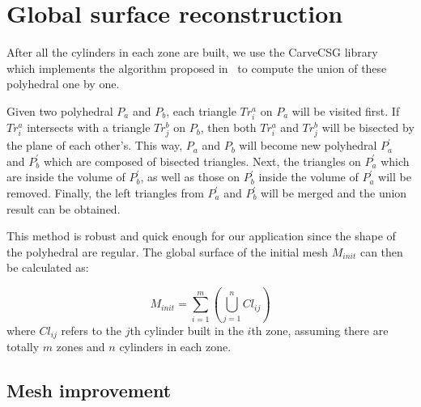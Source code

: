 \section{Global surface reconstruction} \label{ch4:sec:algo:global}


After all the cylinders in each zone are built, we use the
CarveCSG library~\cite{CarveCSG} which implements the algorithm proposed
in~\cite{LTH86} to compute the union of these polyhedral one by one.

Given two polyhedral $P_a$ and $P_b$, each triangle $Tr^a_i$ on $P_a$ will be
visited first. If $Tr^a_i$ intersects with a triangle $Tr^b_j$ on $P_b$, then
both $Tr^a_i$ and $Tr^b_j$ will be bisected by the plane of each other's.
This way, $P_a$ and $P_b$ will become new polyhedral $P^\prime_a$ and
$P^\prime_b$ which are composed of bisected triangles. Next, the triangles on
$P^\prime_a$ which are inside the volume of $P^\prime_b$, as well as
those on $P^\prime_b$ inside the volume of $P^\prime_a$ will be removed.
Finally, the left triangles from $P^\prime_a$ and $P^\prime_b$ will
be merged and the union result can be obtained.

This method is robust and quick enough for our application since the shape
of the polyhedral are regular. The global surface of the initial mesh
$M_{init}$ can then be calculated as:

\begin{equation}
\label{eq:surfreconstortho}
    M_{init}=\sum\limits_{i=1}^m {(\bigcup\limits_{j = 1}^n {Cl_{ij}})}
\end{equation}
where $Cl_{ij}$ refers to the $j$th cylinder built in  the $i$th
zone, assuming there are totally $m$ zones and $n$ cylinders in each
zone.

\subsection{Mesh improvement}
\label{ch4:sec:algo:global:improve}

